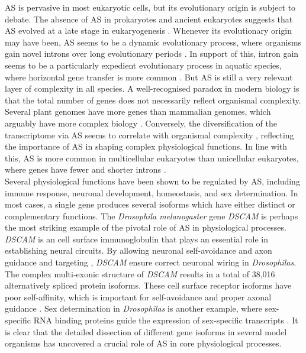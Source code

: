 AS is pervasive in most eukaryotic cells, but its evolutionary origin is subject to debate. The absence of AS in prokaryotes and ancient eukaryotes suggests that AS evolved at a late stage in eukaryogenesis \cite{Koonin2006-eh}. Whenever its evolutionary origin may have been, AS seems to be a dynamic evolutionary process, where organisms gain novel introns over long evolutionary periods \cite{Knowles2006-zy}. In support of this, intron gain seems to be a particularly expedient evolutionary process in aquatic species, where horizontal gene transfer is more common \cite{Gozashti2022-bz}. But AS is still a very relevant layer of complexity in all species. A well-recognised paradox in modern biology is that the total number of genes does not necessarily reflect organismal complexity. Several plant genomes have more genes than mammalian genomes, which arguably have more complex biology \cite{Messing2001-wb}. Conversely, the diversification of the transcriptome via AS seems to correlate with organismal complexity \cite{Bush2017-nz}, reflecting the importance of AS in shaping complex physiological functions. In line with this, AS is more common in multicellular eukaryotes than unicellular eukaryotes, where genes have fewer and shorter introns \cite{Marasco2023-kt}. \\

Several physiological functions have been shown to be regulated by AS, including immune response, neuronal development, homeostasis, and sex determination. In most cases, a single gene produces several isoforms which have either distinct or complementary functions. The \textit{Drosophila melanogaster} gene \textit{DSCAM} is perhaps the most striking example of the pivotal role of AS in physiological processes. \textit{DSCAM} is an cell surface immunoglobulin that plays an essential role in establishing neural circuits. By allowing neuronal self-avoidance and axon guidance and targeting \cite{Hattori2008-jd}, \textit{DSCAM} ensure correct neuronal wiring in \textit{Drosophilas}. The complex multi-exonic structure of \textit{DSCAM} results in a total of 38,016 alternatively spliced protein isoforms. These cell surface receptor isoforms have poor self-affinity, which is important for self-avoidance and proper axonal guidance \cite{Wojtowicz2004-df}. Sex determination in \textit{Drosophilas} is another example, where sex-specific RNA binding proteins guide the expression of sex-specific transcripts \cite{Penalva2003-bu}. It is clear that the detailed dissection of different gene isoforms in several model organisms has uncovered a crucial role of AS in core physiological processes. 

